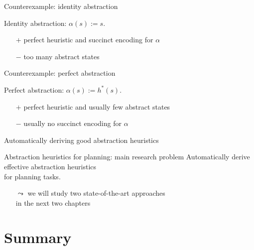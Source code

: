 \documentclass{gkibeamer}
\begin{document}
\begin{frame}{Counterexample: identity abstraction}
  \begin{center}
    \picfulltransitiongraph
  \end{center}

  \alert{Identity abstraction:} $\alpha(s) := s$.
  \begin{itemize}
  \item[$+$] \alert{perfect heuristic}
    and \alert{succinct encoding for $\alpha$}
  \item[$-$] \alert{too many abstract states}
  \end{itemize}
\end{frame}

\begin{frame}{Counterexample: perfect abstraction}
  \begin{center}
    \picperfectabstraction
  \end{center}

  \alert{Perfect abstraction:} $\alpha(s) := h^*(s)$. \\
  \begin{itemize}
  \item[$+$] \alert{perfect heuristic} and
    usually \alert{few abstract states}
  \item[$-$] usually \alert{no succinct encoding for $\alpha$}
  \end{itemize}
\end{frame}

\begin{frame}{Automatically deriving good abstraction heuristics}
  \begin{block}{Abstraction heuristics for planning: main research
      problem}
    \alert{Automatically derive effective abstraction heuristics} \\
    for planning tasks.
  \end{block}

  \begin{itemize}
  \item[$\leadsto$] we will study two state-of-the-art approaches \\
    in the next two chapters
  \end{itemize}
\end{frame}

\section*{Summary}
\end{document}
